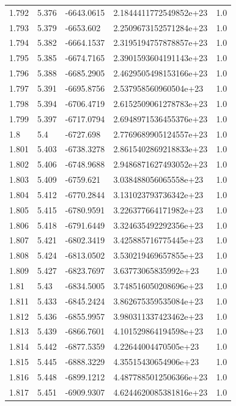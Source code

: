 \begin{tabular}{lllll}
1.792 & 5.376 & -6643.0615 & 2.1844411772549852e+23 & 1.0 \\
1.793 & 5.379 & -6653.602 & 2.2509673152571284e+23 & 1.0 \\
1.794 & 5.382 & -6664.1537 & 2.3195194757878857e+23 & 1.0 \\
1.795 & 5.385 & -6674.7165 & 2.3901593604191143e+23 & 1.0 \\
1.796 & 5.388 & -6685.2905 & 2.4629505498153166e+23 & 1.0 \\
1.797 & 5.391 & -6695.8756 & 2.537958560960504e+23 & 1.0 \\
1.798 & 5.394 & -6706.4719 & 2.6152509061278783e+23 & 1.0 \\
1.799 & 5.397 & -6717.0794 & 2.6948971536455376e+23 & 1.0 \\
1.8 & 5.4 & -6727.698 & 2.7769689905124557e+23 & 1.0 \\
1.801 & 5.403 & -6738.3278 & 2.8615402869218833e+23 & 1.0 \\
1.802 & 5.406 & -6748.9688 & 2.9486871627493052e+23 & 1.0 \\
1.803 & 5.409 & -6759.621 & 3.038488056065558e+23 & 1.0 \\
1.804 & 5.412 & -6770.2844 & 3.131023793736342e+23 & 1.0 \\
1.805 & 5.415 & -6780.9591 & 3.226377664171982e+23 & 1.0 \\
1.806 & 5.418 & -6791.6449 & 3.324635492292356e+23 & 1.0 \\
1.807 & 5.421 & -6802.3419 & 3.425885716775445e+23 & 1.0 \\
1.808 & 5.424 & -6813.0502 & 3.530219469657855e+23 & 1.0 \\
1.809 & 5.427 & -6823.7697 & 3.63773065835992e+23 & 1.0 \\
1.81 & 5.43 & -6834.5005 & 3.748516050208696e+23 & 1.0 \\
1.811 & 5.433 & -6845.2424 & 3.862675359535084e+23 & 1.0 \\
1.812 & 5.436 & -6855.9957 & 3.980311337423462e+23 & 1.0 \\
1.813 & 5.439 & -6866.7601 & 4.101529864194598e+23 & 1.0 \\
1.814 & 5.442 & -6877.5359 & 4.22644004470505e+23 & 1.0 \\
1.815 & 5.445 & -6888.3229 & 4.35515430654906e+23 & 1.0 \\
1.816 & 5.448 & -6899.1212 & 4.4877885012506366e+23 & 1.0 \\
1.817 & 5.451 & -6909.9307 & 4.6244620085381816e+23 & 1.0 \\

\end{tabular}
